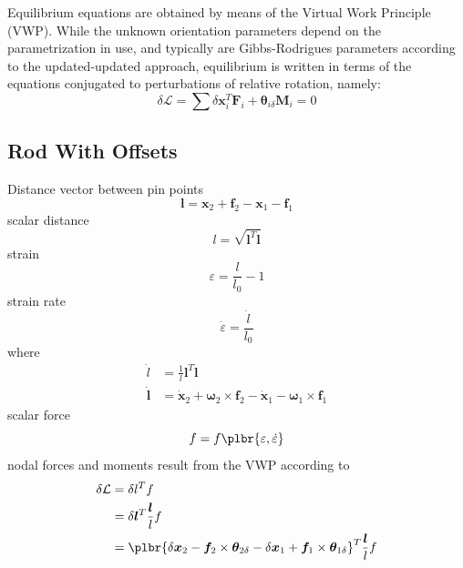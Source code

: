 \documentclass[10pt,fleqn,subeqn]{report}
\newcommand{\T}[1]{\bm{#1}}
\begin{document}
Equilibrium equations are obtained by means of the Virtual Work
Principle (VWP).
While the unknown orientation parameters depend on the parametrization 
in use, and typically are Gibbs-Rodrigues parameters according 
to the updated-updated approach, equilibrium is written in terms
of the equations conjugated to perturbations of relative rotation,
namely:
\begin{equation}
	\delta\mathcal{L} = \sum \delta\T{x}_i^T \T{F}_i
	+ \T{\theta}_{i\delta} \T{M}_i = 0
\end{equation}

\subsection{Rod With Offsets}
Distance vector between pin points
\begin{equation}
	\T{l} = \T{x}_2 + \T{f}_2 - \T{x}_1 - \T{f}_1
\end{equation}
scalar distance
\begin{equation}
	l = \sqrt{\T{l}^T \T{l}}
\end{equation}
strain
\begin{equation}
	\varepsilon = \frac{l}{l_0} - 1
\end{equation}
strain rate
\begin{equation}
	\dot{\varepsilon} = \frac{\dot{l}}{l_0}
\end{equation}
where
\begin{subequations}
\begin{align}
	\dot{l} &= \frac{1}{l} \T{l}^T \dot{\T{l}} \\
	\dot{\T{l}} &= \dot{\T{x}}_2 + \T{\omega}_2 \times \T{f}_2
		- \dot{\T{x}}_1 - \T{\omega}_1 \times \T{f}_1
\end{align}
\end{subequations}
scalar force
\begin{equation}
	f = f\plbr{\varepsilon, \dot{\varepsilon}}
\end{equation}
nodal forces and moments result from the VWP according to
\begin{subequations}
\begin{align}
	\delta \mathcal{L} &= \delta l^T f \\
	&= \delta\T{l}^T \frac{\T{l}}{l} f \\
	&= \plbr{
		\delta\T{x}_2
		- \T{f}_2 \times \T{\theta}_{2\delta}
		- \delta\T{x}_1
		+ \T{f}_1 \times \T{\theta}_{1\delta}
	}^T \frac{\T{l}}{l} f
\end{align}
\end{subequations}
\end{document}

